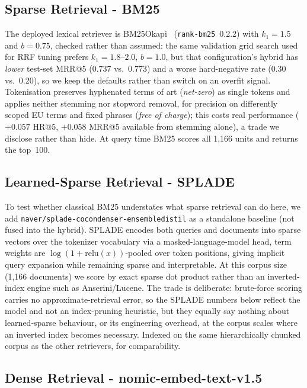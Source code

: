 \documentclass[conference,a4paper]{IEEEtran}
\makeatletter
\newcommand{\HR}[1]{\mathrm{HR}@{#1}}
\newcommand{\MRR}[1]{\mathrm{MRR}@{#1}}
\makeatother
\begin{document}
\subsection{Sparse Retrieval - BM25}

The deployed lexical retriever is BM25Okapi~\cite{15}
(\texttt{rank-bm25}~0.2.2) with $k_1{=}1.5$ and $b{=}0.75$, checked
rather than assumed: the same validation grid search used for RRF
tuning prefers $k_1{=}1.8$--$2.0$, $b{=}1.0$, but that configuration's
hybrid has \emph{lower} test-set $\MRR{5}$ (0.737 vs.\ 0.773) and a
worse hard-negative rate (0.30 vs.\ 0.20), so we keep the defaults
rather than switch on an overfit signal.
Tokenisation preserves hyphenated terms of art (\textit{net-zero}) as
single tokens and applies neither stemming nor stopword removal, for
precision on differently scoped EU terms and fixed phrases
(\textit{free of charge}); this costs real performance
($+0.057$ $\HR{5}$, $+0.058$ $\MRR{5}$ available from stemming alone),
a trade we disclose rather than hide.
At query time BM25 scores all 1{,}166 units and returns the top~100.

\subsection{Learned-Sparse Retrieval - SPLADE}

To test whether classical BM25 understates what sparse retrieval can
do here, we add \texttt{naver/splade-cocondenser-ensembledistil} as a
standalone baseline (not fused into the hybrid).
SPLADE encodes both queries and documents into sparse vectors over
the tokenizer vocabulary via a masked-language-model head, term
weights are $\log(1{+}\mathrm{relu}(x))$-pooled over token positions,
giving implicit query expansion while remaining sparse and
interpretable.
At this corpus size (1{,}166 documents) we score by exact sparse dot
product rather than an inverted-index engine such as Anserini/Lucene.
The trade is deliberate: brute-force scoring carries no
approximate-retrieval error, so the SPLADE numbers below reflect the
model and not an index-pruning heuristic, but they equally say
nothing about learned-sparse behaviour, or its engineering overhead,
at the corpus scales where an inverted index becomes necessary.
Indexed on the same hierarchically chunked corpus as the other
retrievers, for comparability.

\subsection{Dense Retrieval - nomic-embed-text-v1.5}
\end{document}
